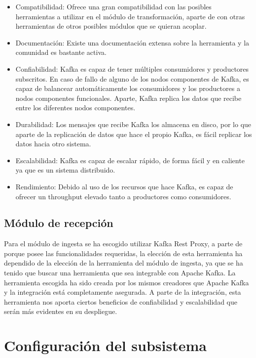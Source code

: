 \begin{itemize}
	\item Compatibilidad: Ofrece una gran compatibilidad con las posibles herramientas a utilizar en el módulo de transformación, aparte de con otras herramientas de otros posibles módulos que se quieran acoplar.
	
	\item Documentación: Existe una documentación extensa sobre la herramienta y la comunidad es bastante activa.
	
	\item Confiabilidad: Kafka es capaz de tener múltiples consumidores y productores subscritos. En caso de fallo de alguno de los nodos componentes de Kafka, es capaz de balancear automáticamente los consumidores y los productores a nodos componentes funcionales. Aparte, Kafka replica los datos que recibe entre los diferentes nodos componentes.
	
	\item Durabilidad: Los mensajes que recibe Kafka los almacena en disco, por lo que aparte de la replicación de datos que hace el propio Kafka, es fácil replicar los datos hacia otro sistema.
	
	\item Escalabilidad: Kafka es capaz de escalar rápido, de forma fácil y en caliente ya que es un sistema distribuido.
	
	\item Rendimiento: Debido al uso de los recursos que hace Kafka, es capaz de ofrecer un throughput elevado tanto a productores como consumidores.
\end{itemize}

\subsection{Módulo de recepción}
Para el módulo de ingesta se ha escogido utilizar Kafka Rest Proxy\cite{Tfg:kafkarestproxy}, a parte de porque posee las funcionalidades requeridas, la elección de esta herramienta ha dependido de la elección de la herramienta del módulo de ingesta, ya que se ha tenido que buscar una herramienta que sea integrable con Apache Kafka. La herramienta escogida ha sido creada por los mismos creadores que Apache Kafka y la integración está completamente asegurada. A parte de la integración, esta herramienta nos aporta ciertos beneficios de confiabilidad y escalabilidad que serán más evidentes en su despliegue.

\section{Configuración del subsistema}

